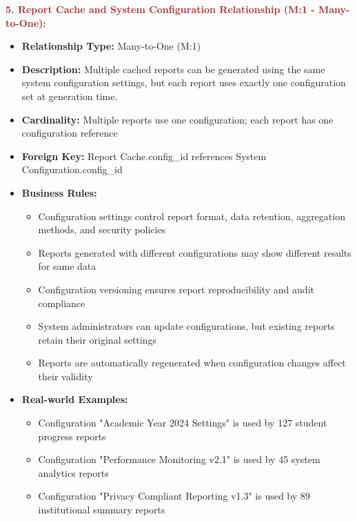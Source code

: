 \documentclass[12pt,a4paper,oneside]{book}
\begin{document}
\textbf{\textcolor{brown}{5. Report Cache and System Configuration Relationship (M:1 - Many-to-One):}}
\begin{itemize}
    \item \textbf{Relationship Type:} Many-to-One (M:1)
    \item \textbf{Description:} Multiple cached reports can be generated using the same system configuration settings, but each report uses exactly one configuration set at generation time.
    \item \textbf{Cardinality:} Multiple reports use one configuration; each report has one configuration reference
    \item \textbf{Foreign Key:} Report Cache.config\_id references System Configuration.config\_id
    \item \textbf{Business Rules:}
        \begin{itemize}
            \item Configuration settings control report format, data retention, aggregation methods, and security policies
            \item Reports generated with different configurations may show different results for same data
            \item Configuration versioning ensures report reproducibility and audit compliance
            \item System administrators can update configurations, but existing reports retain their original settings
            \item Reports are automatically regenerated when configuration changes affect their validity
        \end{itemize}
    \item \textbf{Real-world Examples:}
        \begin{itemize}
            \item Configuration "Academic Year 2024 Settings" is used by 127 student progress reports
            \item Configuration "Performance Monitoring v2.1" is used by 45 system analytics reports
            \item Configuration "Privacy Compliant Reporting v1.3" is used by 89 institutional summary reports
        \end{itemize}
\end{itemize}
\end{document}
